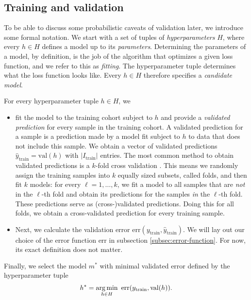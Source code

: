 \subsection{Training and validation}\label{subsec:train-val}

To be able to discuss some probabilistic caveats of validation later, we introduce some formal 
notation. We start with a set of tuples of \textit{hyperparameters} $H$, where every $h \in H$ defines a model
up to its \textit{parameters}. Determining the parameters of a model, by definition, is the job of the 
algorithm that optimizes a given loss function, and we refer to this as \textit{fitting}. 
The hyperparameter tuple determines what the loss function looks like.
Every $h \in H$ therefore specifies a \textit{candidate model}.

For every hyperparameter tuple $h \in H$, we
\begin{itemize}
    \item fit the model to the training cohort subject to $h$ and provide a
        \textit{validated prediction} for 
        every sample in the training cohort.
        A validated prediction for a sample is a prediction made by a model fit 
        subject to $h$ to data that does not include this sample. We obtain a vector of validated 
        predictions $\hat{y}_\text{train} = \text{val}(h)$ with $|I_\text{train}|$ entries.
        The most common method to obtain validated predictions is a $k$-fold cross validation 
        \cite{stone74}.
        This means we randomly assign the training samples into $k$ equally sized subsets, called 
        folds, and then fit $k$ models: for every $\ell = 1, \ldots, k$, we fit a model to all 
        samples that are \textit{not} in the $\ell$-th fold and obtain its predictions for the samples 
        \textit{in} the $\ell$-th fold. These predictions serve as (cross-)validated predictions. 
        Doing this for all 
        folds, we obtain a cross-validated prediction for every training sample.
    \item Next, we calculate the validation error 
        $\text{err}(y_\text{train}, \hat{y}_\text{train})$. We will lay out our choice of the 
        error function $\text{err}$ in subsection \ref{subsec:error-function}. For now, its 
        exact definition does not matter.
\end{itemize}
Finally, we select the model $m^*$ with minimal validated error defined by the hyperparameter tuple 
\begin{align}
    h^* = \operatorname*{arg\,min}_{h \in H} \ \text{err}(y_\text{train}, \text{val}(h)).
\end{align}


